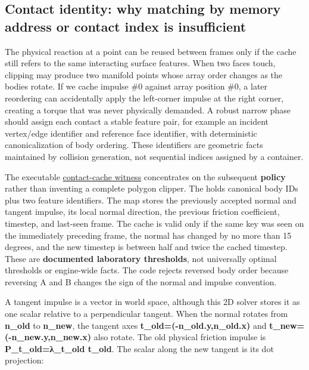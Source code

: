\subsection{Contact identity: why matching by memory address or contact index is insufficient}\label{appendix-c9d92e145503-contact-identity-why-matching-by-memory-address-or-contact-index-is-insufficient}

\hypertarget{appendix-c9d92e145503-contact-identity-why-matching-by-memory-address-or-contact-index-is-insufficient}{}

The physical reaction at a point can be reused between frames only if the cache still refers to the same interacting surface features. When two faces touch, clipping may produce two manifold points whose array order changes as the bodies rotate. If we cache impulse \#0 against array position \#0, a later reordering can accidentally apply the left-corner impulse at the right corner, creating a torque that was never physically demanded. A robust narrow phase should assign each contact a stable feature pair, for example an incident vertex/edge identifier and reference face identifier, with deterministic canonicalization of body ordering. These identifiers are geometric facts maintained by collision generation, not sequential indices assigned by a container.

The executable \hyperref[source-file-830b13449e1c6505af693753]{contact-cache witness} concentrates on the subsequent \textbf{policy} rather than inventing a complete polygon clipper. The  holds canonical body IDs plus two feature identifiers. The map stores the previously accepted normal and tangent impulse, its local normal direction, the previous friction coefficient, timestep, and last-seen frame. The cache is valid only if the same key was seen on the immediately preceding frame, the normal has changed by no more than 15 degrees, and the new timestep is between half and twice the cached timestep. These are \textbf{documented laboratory thresholds}, not universally optimal thresholds or engine-wide facts. The code rejects reversed body order because reversing A and B changes the sign of the normal and impulse convention.

A tangent impulse is a vector in world space, although this 2D solver stores it as one scalar relative to a perpendicular tangent. When the normal rotates from \textbf{n\_old} to \textbf{n\_new}, the tangent axes \textbf{t\_old=(-n\_old.y,n\_old.x)} and \textbf{t\_new=(-n\_new.y,n\_new.x)} also rotate. The old physical friction impulse is \textbf{P\_t\_old=λ\_t\_old t\_old}. The scalar along the new tangent is its dot projection:

